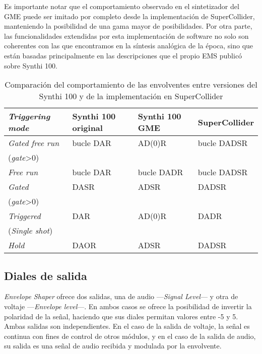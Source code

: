 Es importante notar que el comportamiento observado en el sintetizador del GME puede ser imitado por completo desde la implementación de SuperCollider, manteniendo la posibilidad de una gama mayor de posibilidades. Por otra parte, las funcionalidades extendidas por esta implementación de software no solo son coherentes con las que encontramos en la síntesis analógica de la época, sino que están basadas principalmente en las descripciones que el propio EMS publicó sobre Synthi 100.



\begin{table}
	\begin{center}
		\begin{tabular}{ llll }
			\textit{Triggering mode}	& Synthi 100 original	& Synthi 100 GME	& SuperCollider\\
			\hline
			\textit{Gated free run} 	& bucle DAR 		 	& AD(0)R			& bucle DADSR\\
			(\textit{gate}>0)\\ 
			\textit{Free run}			& bucle DAR				& bucle DADR		& bucle DADSR\\
			\textit{Gated}				& DASR					& ADSR				& DADSR\\
			(\textit{gate}>0)\\ 
			\textit{Triggered}			& DAR					& AD(0)R			& DADR\\
			(\textit{Single shot})\\
			\textit{Hold}				& DAOR					& ADSR				& DADSR\\
			
		\end{tabular}
		\caption[Comparación de envolventes del Synthi 100]{Comparación del comportamiento de las envolventes entre versiones del Synthi 100 y de la implementación en SuperCollider}
		\label{table:envolventes}
	\end{center}
\end{table}

\subsection{Diales de salida}

\textit{Envelope Shaper} ofrece dos salidas, una de audio ---\textit{Signal Level}--- y otra de voltaje ---\textit{Envelope level}---. En ambos casos se ofrece la posibilidad de invertir la polaridad de la señal, haciendo que sus diales permitan valores entre -5 y 5. Ambas salidas son independientes. En el caso de la salida de voltaje, la señal es continua con fines de control de otros módulos, y en el caso de la salida de audio, su salida es una señal de audio recibida y modulada por la envolvente.
